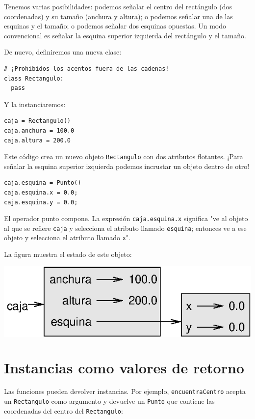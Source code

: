 Tenemos varias posibilidades: podemos señalar el centro del rectángulo
(dos coordenadas) y su tamaño (anchura y altura); o podemos señalar una de
las esquinas y el tamaño; o podemos señalar dos esquinas opuestas. Un modo
convencional es señalar la esquina superior izquierda del rectángulo y el tamaño.

De nuevo, definiremos una nueva clase:

\beforeverb
\begin{verbatim}
# ¡Prohibidos los acentos fuera de las cadenas!
class Rectangulo:	
  pass
\end{verbatim}
\afterverb
%
Y la instanciaremos:

\beforeverb
\begin{verbatim}
caja = Rectangulo()
caja.anchura = 100.0
caja.altura = 200.0
\end{verbatim}
\afterverb
%
Este código crea un nuevo objeto \texttt{Rectangulo} con dos atributos flotantes.
¡Para señalar la esquina superior izquierda podemos incrustar un objeto dentro de otro!

\beforeverb
\begin{verbatim}
caja.esquina = Punto()
caja.esquina.x = 0.0;
caja.esquina.y = 0.0;
\end{verbatim}
\afterverb
%
El operador punto compone. La expresión \texttt{caja.esquina.x} significa
"ve al objeto al que se refiere \texttt{caja} y selecciona el atributo llamado
\texttt{esquina}; entonces ve a ese objeto y selecciona el atributo llamado
\texttt{x}".

La figura muestra el estado de este objeto:

\beforefig
\centerline{\includegraphics{illustrations/rectangle.eps}}
\afterfig


\section{Instancias como valores de retorno}

Las funciones pueden devolver instancias. Por ejemplo, \texttt{encuentraCentro}
acepta un \texttt{Rectangulo} como argumento y devuelve un \texttt{Punto} que
contiene las coordenadas del centro del \texttt{Rectangulo}:

